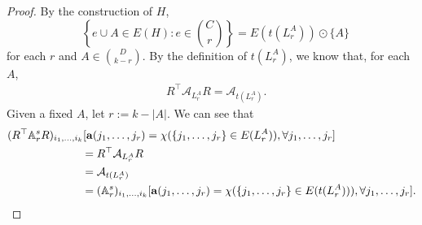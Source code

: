 \documentclass[12pt]{article}
\numberwithin{equation}{section}
\theoremstyle{definition}
\newcommand{\ev}[1]{( #1 )}
\begin{document}
\begin{proof}
By the construction of $H$, 
\begin{equation}
\label{eqn:assumption_implies_2}
\text{ $\left\{ e \cup A \in E\ev{H}: e\in \binom{C}{r} \right\} = E\ev{t\ev{L_r^A}} \odot \{A\}$}
\end{equation}
for each $r$ and $A \in \binom{D}{k-r}$. By the definition of $t\ev{L_r^A}$, we know that, for each $A$,
\begin{align*}
& R^\top \mathcal{A}_{L_r^A} R = \mathcal{A}_{t\ev{L_r^A}}.
\end{align*}
Given a fixed $A$, let $r:= k-|A|$. We can see that
\begin{align*}
\ev{ R^\top \mathbb{A}^{s}_r R }_{i_1,\ldots,i_k} [ \mathbf{a}\ev{j_1,\ldots,j_r}& = \chi\ev{ \{ j_1, \ldots, j_r \} \in E\ev{L_r^A} }, \forall j_1,\ldots,j_r ]\\
& \hspace{-2cm}= R^\top \mathcal{A}_{L_r^A} R \\
& \hspace{-2cm}= \mathcal{A}_{t\ev{L_r^A}}  \\
& \hspace{-2cm} = \ev{ \mathbb{A}^{s}_r }_{i_1,\ldots,i_k} [ \mathbf{a}\ev{j_1,\ldots,j_r} = \chi\ev{ \{ j_1, \ldots, j_r \} \in E\ev{t\ev{L_r^A}} }, \forall j_1,\ldots,j_r ].
\end{align*}


\end{proof}
\end{document}
